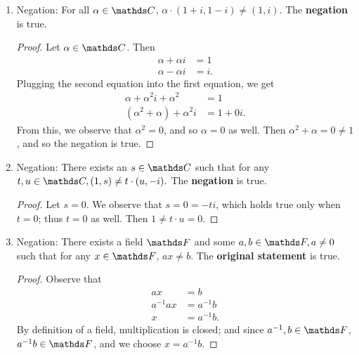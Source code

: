 \documentclass{review-sheet}
\begin{document}
\begin{solution}
  \begin{enumerate}[label=(\alph*)]
    \item Negation: For all $\alpha\in \C$, $ \alpha\cdot (1+i,1-i) \neq (1,i)$. The
      \textbf{negation} is true.
      \begin{proof}[Proof]
        Let $ \alpha\in \C$. Then
        \begin{align*}
          \alpha+\alpha i&= 1 \\
          \alpha-\alpha i &= i
        .\end{align*} Plugging the second equation into the first equation, we get
        \begin{align*}
          \alpha+\alpha^2i+\alpha^2&= 1 \\
          \left( \alpha^2+\alpha \right) +\alpha^2i&=1+0i
        .\end{align*} From this, we observe that $\alpha^2=0$, and so $\alpha=0$ as well. Then
        $\alpha^2+\alpha=0\neq 1$, and so the negation is true.
      \end{proof}
      
    \item Negation: There exists an $s \in \C$ such that for any $t,u\in \C, (1,s)\neq t\cdot
      (u,-i).$ The \textbf{negation} is true.
      \begin{proof}[Proof]
        Let $s=0$. We observe that $s=0=-ti$, which holds true only when  $t=0$; thus  $t=0$ as
        well. Then  $1\neq t\cdot u=0$.
      \end{proof}
      
    \item Negation: There exists a field $\F$ and some $a,b\in \F, a\neq 0$ such that for any $x\in
      \F$, $ax\neq b$. The \textbf{original statement} is true.
      \begin{proof}[Proof]
        Observe that
         \begin{align*}
          ax &= b \\
          a^{-1}ax&= a^{-1}b \\
          x&= a^{-1}b
        .\end{align*} By definition of a field, multiplication is closed; and since $a^{-1},b\in
        \F$, $a^{-1}b\in \F$, and we choose $x=a^{-1}b$.
      \end{proof}


\end{enumerate}
\end{solution}
\end{document}
